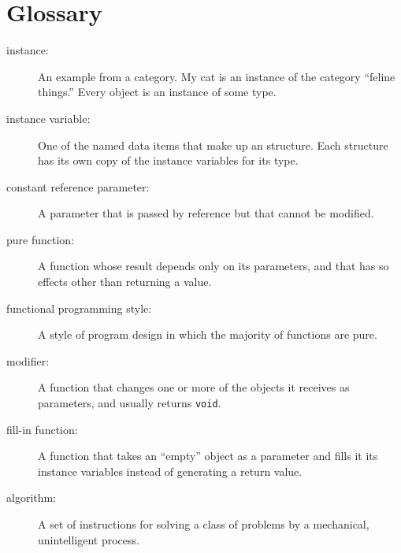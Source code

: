 \section{Glossary}

\begin{description}

\item[instance:]  An example from a category.  My cat is an
instance of the category ``feline things.''  Every object is
an instance of some type.

\item[instance variable:]  One of the named data items that make
up an structure.  Each structure has its own copy of
the instance variables for its type.

\item[constant reference parameter:]  A parameter that is passed
by reference but that cannot be modified.

\item[pure function:]  A function whose result depends only on its
parameters, and that has so effects other than returning
a value.

\item[functional programming style:]  A style of program design
in which the majority of functions are pure.

\item[modifier:]  A function that changes one or more of the objects
it receives as parameters, and usually returns {\tt void}.

\item[fill-in function:]  A function that takes an ``empty''
object as a parameter and fills it its instance variables instead
of generating a return value.

\item[algorithm:]  A set of instructions for solving a class of
problems by a mechanical, unintelligent process.


\end{description}

